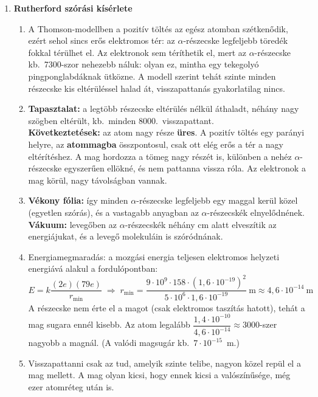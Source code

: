 \documentclass[11pt,a4paper]{article}
\begin{document}
\begin{enumerate}
\item \textbf{Rutherford szórási kísérlete}
  \begin{enumerate}
    \item A Thomson-modellben a pozitív töltés az egész atomban szétkenődik, ezért sehol
      sincs erős elektromos tér: az $\alpha$-részecske legfeljebb töredék fokkal térülhet
      el. Az elektronok sem téríthetik el, mert az $\alpha$-részecske kb.\ 7300-szor
      nehezebb náluk: olyan ez, mintha egy tekegolyó pingponglabdáknak ütközne.
      A modell szerint tehát szinte minden részecske kis eltérüléssel halad át,
      visszapattanás gyakorlatilag nincs.
    \item \textbf{Tapasztalat:} a legtöbb részecske eltérülés nélkül áthaladt, néhány nagy
      szögben eltérült, kb.\ minden 8000.\ visszapattant.\\
      \textbf{Következtetések:} az atom nagy része \textbf{üres}. A pozitív töltés egy
      parányi helyre, az \textbf{atommagba} összpontosul, csak ott elég erős a tér a nagy
      eltérítéshez. A mag hordozza a tömeg nagy részét is, különben a nehéz
      $\alpha$-részecske egyszerűen ellökné, és nem pattanna vissza róla. Az elektronok a
      mag körül, nagy távolságban vannak.
    \item \textbf{Vékony fólia:} így minden $\alpha$-részecske legfeljebb egy maggal kerül
      közel (egyetlen szórás), és a vastagabb anyagban az $\alpha$-részecskék elnyelődnének.
      \textbf{Vákuum:} levegőben az $\alpha$-részecskék néhány cm alatt elveszítik az
      energiájukat, és a levegő molekuláin is szóródnának.
    \item Energiamegmaradás: a mozgási energia teljesen elektromos helyzeti energiává alakul
      a fordulópontban:
      \[ E = k\frac{(2e)(79e)}{r_\text{min}} \;\Rightarrow\;
         r_\text{min} = \frac{9\cdot 10^9\cdot 158\cdot (1{,}6\cdot 10^{-19})^2}{5\cdot 10^6\cdot
         1{,}6\cdot 10^{-19}}~\text{m} \approx 4{,}6\cdot 10^{-14}~\text{m} \]
      A részecske nem érte el a magot (csak elektromos taszítás hatott), tehát a mag
      sugara ennél kisebb. Az atom legalább
      $\dfrac{1{,}4\cdot 10^{-10}}{4{,}6\cdot 10^{-14}} \approx 3000$-szer nagyobb a magnál.
      (A valódi magsugár kb.\ $7\cdot 10^{-15}$~m.)
    \item Visszapattanni csak az tud, amelyik szinte telibe, nagyon közel repül el a mag
      mellett. A mag olyan kicsi, hogy ennek kicsi a valószínűsége, még ezer atomréteg
      után is.
  \end{enumerate}


\end{enumerate}
\end{document}
